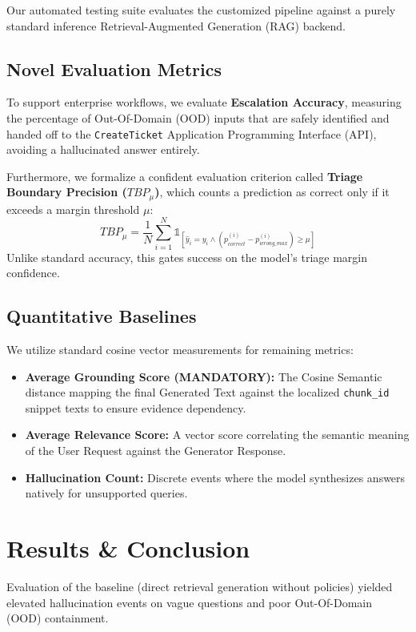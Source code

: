 \documentclass[11pt]{article}
\begin{document}
Our automated testing suite evaluates the customized pipeline against a purely standard inference Retrieval-Augmented Generation (RAG) backend.

\subsection{Novel Evaluation Metrics}
To support enterprise workflows, we evaluate \textbf{Escalation Accuracy}, measuring the percentage of Out-Of-Domain (OOD) inputs that are safely identified and handed off to the \texttt{CreateTicket} Application Programming Interface (API), avoiding a hallucinated answer entirely.

Furthermore, we formalize a confident evaluation criterion called \textbf{Triage Boundary Precision ($TBP_{\mu}$)}, which counts a prediction as correct only if it exceeds a margin threshold $\mu$:
\begin{equation}
TBP_{\mu} = \frac{1}{N} \sum_{i=1}^{N} \mathbb{1}_{[\hat{y}_i = y_i \land (p^{(i)}_{correct} - p^{(i)}_{wrong\_max}) \ge \mu]}
\end{equation}
Unlike standard accuracy, this gates success on the model's triage margin confidence.
\subsection{Quantitative Baselines}
We utilize standard cosine vector measurements for remaining metrics:
\begin{itemize}
    \item \textbf{Average Grounding Score (MANDATORY):} The Cosine Semantic distance mapping the final Generated Text against the localized \texttt{chunk\_id} snippet texts to ensure evidence dependency.
    \item \textbf{Average Relevance Score:} A vector score correlating the semantic meaning of the User Request against the Generator Response.
    \item \textbf{Hallucination Count:} Discrete events where the model synthesizes answers natively for unsupported queries.
\end{itemize}

\section{Results \& Conclusion}
Evaluation of the baseline (direct retrieval generation without policies) yielded elevated hallucination events on vague questions and poor Out-Of-Domain (OOD) containment. 
\end{document}
